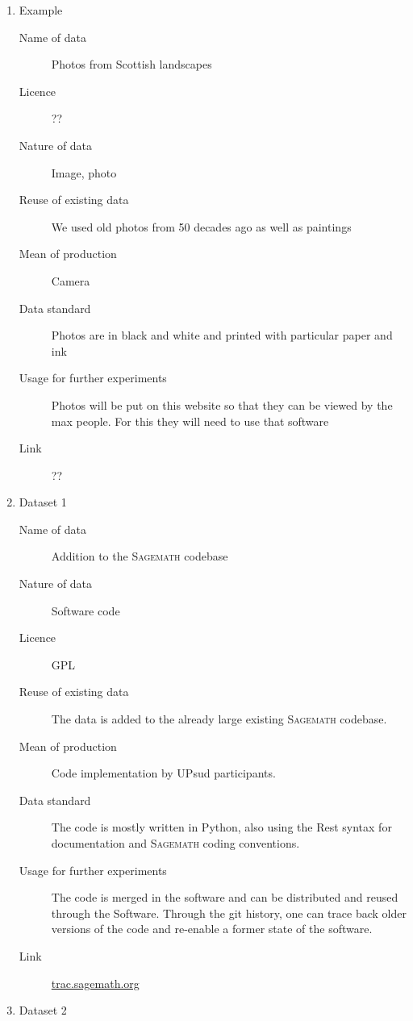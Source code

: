 \documentclass[12pt]{article}
\newcommand{\software}[1]{\textsc{#1}\xspace}
\newcommand{\Sage}{\software{Sagemath}}
\begin{document}
\begin{enumerate}


\item{Example}


\begin{description}
\item[Name of data] Photos from Scottish landscapes
\item[Licence]  ??
\item[Nature of data] Image, photo
\item[Reuse of existing data] We used old photos from 50 decades ago as well as paintings
\item[Mean of production] Camera
\item[Data standard] Photos are in black and white and printed with particular paper and ink
\item [Usage for further experiments] Photos will be put on this website so that they can be viewed by the max people. For this they will need to use that software
\item [Link] ??
\end{description}


\item {Dataset 1}


\begin{description}
\item[Name of data] Addition to the \Sage codebase
\item[Nature of data] Software code
\item[Licence] GPL
\item[Reuse of existing data] The data is added to the already large existing \Sage codebase.
\item[Mean of production] Code implementation by UPsud participants.
\item[Data standard] The code is mostly written in Python, also using the Rest syntax for documentation and \Sage coding conventions.
\item [Usage for further experiments] The code is merged in the software and can be distributed and reused through the Software. Through the git history,
one can trace back older versions of the code and re-enable a former state of the software.
\item [Link] \href{http://trac.sagemath.org/}{trac.sagemath.org}
\end{description}


\item{Dataset 2}



\end{enumerate}
\end{document}

